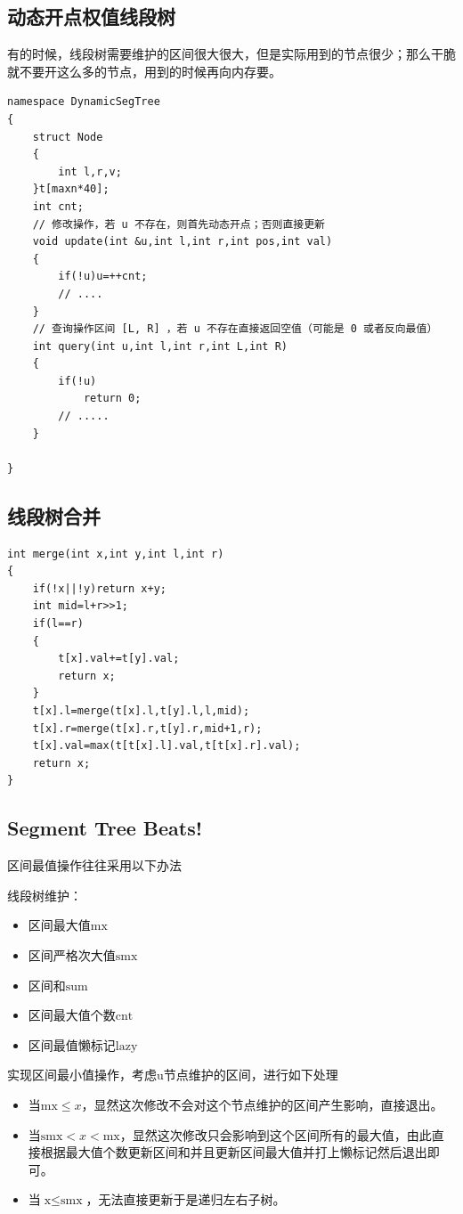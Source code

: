 \subsection{动态开点权值线段树}
\par \noindent 有的时候，线段树需要维护的区间很大很大，但是实际用到的节点很少；那么干脆就不要开这么多的节点，用到的时候再向内存要。

\begin{verbatim}
namespace DynamicSegTree
{
    struct Node
    {
        int l,r,v;
    }t[maxn*40];
    int cnt;
    // 修改操作，若 u 不存在，则首先动态开点；否则直接更新
    void update(int &u,int l,int r,int pos,int val)
    {
        if(!u)u=++cnt;
        // ....
    }
    // 查询操作区间 [L, R] ，若 u 不存在直接返回空值（可能是 0 或者反向最值）
    int query(int u,int l,int r,int L,int R)
    {
        if(!u) 
            return 0;
        // .....
    }

}
\end{verbatim}
\subsection{线段树合并}
\begin{verbatim}
int merge(int x,int y,int l,int r)
{
    if(!x||!y)return x+y;
    int mid=l+r>>1;
    if(l==r)
    {
        t[x].val+=t[y].val;
        return x;
    }
    t[x].l=merge(t[x].l,t[y].l,l,mid);
    t[x].r=merge(t[x].r,t[y].r,mid+1,r);
    t[x].val=max(t[t[x].l].val,t[t[x].r].val);
    return x;
}
\end{verbatim}

\subsection{Segment Tree Beats!}
\par \noindent 区间最值操作往往采用以下办法 

\par \noindent 线段树维护：
\begin{itemize}
\item 区间最大值$\text{mx}$  
\item 区间严格次大值$\text {smx}$  
\item 区间和$\text{sum}$ 
\item 区间最大值个数$\text{cnt}$  
\item 区间最值懒标记$\text{lazy}$
\end{itemize}
\par \noindent 实现区间最小值操作，考虑u节点维护的区间，进行如下处理
\begin{itemize}
\item 当$\text{mx}\leq x$，显然这次修改不会对这个节点维护的区间产生影响，直接退出。
\item 当$\text{smx}<x<\text{mx}$，显然这次修改只会影响到这个区间所有的最大值，由此直接根据最大值个数更新区间和并且更新区间最大值并打上懒标记然后退出即可。
\item 当$\text{x}\leq \text{smx}$，无法直接更新于是递归左右子树。
\end{itemize}

